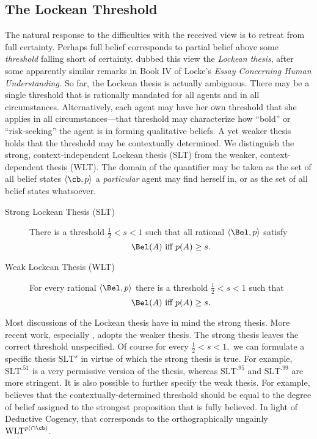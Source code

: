 \subsection{The Lockean Threshold}
\label{lockeanthreshold}
The natural response to the difficulties with the received view is to retreat
from full certainty. Perhaps full belief corresponds to partial belief above
some {\em threshold} falling short of certainty. \citet{foley1993working} dubbed
this view the {\em Lockean thesis}, after some apparently similar remarks in
Book IV of Locke's {\em Essay Concerning Human Understanding.} So far, the
Lockean thesis is actually ambiguous. There may be a single threshold that is
rationally mandated for all agents and in all circumstances. Alternatively, each
agent may have her own threshold that she applies in all circumstances---that
threshold may characterize how ``bold'' or ``risk-seeking'' the agent is in
forming qualitative beliefs. A yet weaker thesis holds that the threshold may be
contextually determined.  We  distinguish the strong, context-independent
Lockean thesis (SLT) from the weaker, context-dependent thesis (WLT). The domain
of the quantifier may be taken as the set of all belief states $\langle \cb,p
\rangle$ a {\em particular} agent may find herself in, or as the set of all
belief states whatsoever.
\begin{description}
\item[Strong Lockean Thesis (SLT)] There is a threshold $\frac{1}{2}<s<1$ such
that all rational  $\langle \Bel, p \rangle$ satisfy $$\Bel(A) \text{ iff } p(A)
\geq s.$$
\item[Weak Lockean Thesis (WLT)] For every rational $\langle \Bel, p \rangle$
there is a threshold $\frac{1}{2}< s < 1$ such that $$\Bel(A) \text{ iff } p(A)
\geq s.$$ 
\end{description}
Most discussions of the Lockean thesis have in mind the strong thesis. More
recent work, especially \citet{leitgeb2017stability}, adopts the weaker thesis.
The strong thesis leaves the correct threshold unspecified. Of course for every
$\frac{1}{2}< s<1,$ we can formulate a specific thesis $\text{SLT}^s$ in virtue
of which the strong thesis is true. For example, $\text{SLT}^{.51}$ is a very
permissive version of the thesis, whereas $\text{SLT}^{.95}$ and
$\text{SLT}^{.99}$ are more stringent. It is also possible to further specify
the weak thesis. For example, \citet{leitgeb2017stability} believes that the
contextually-determined threshold should be equal to the degree of belief
assigned to the strongest proposition that is fully believed. In light of
Deductive Cogency, that corresponds to the orthographically ungainly
$\text{WLT}^{p(\cap \cb)}$.    

